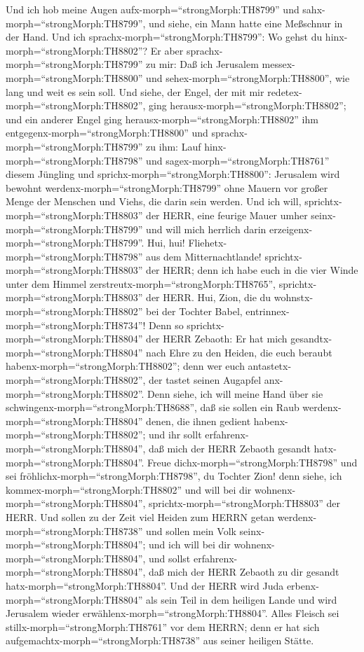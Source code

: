  Und ich hob meine Augen aufx-morph=``strongMorph:TH8799''
und sahx-morph=``strongMorph:TH8799'', und siehe, ein Mann hatte eine
Meßschnur in der Hand.  Und ich
sprachx-morph=``strongMorph:TH8799'': Wo gehst du
hinx-morph=``strongMorph:TH8802''? Er aber
sprachx-morph=``strongMorph:TH8799'' zu mir: Daß ich Jerusalem
messex-morph=``strongMorph:TH8800'' und
sehex-morph=``strongMorph:TH8800'', wie lang und weit es sein soll.
 Und siehe, der Engel, der mit mir
redetex-morph=``strongMorph:TH8802'', ging
herausx-morph=``strongMorph:TH8802''; und ein anderer Engel ging
herausx-morph=``strongMorph:TH8802'' ihm
entgegenx-morph=``strongMorph:TH8800''  und
sprachx-morph=``strongMorph:TH8799'' zu ihm: Lauf
hinx-morph=``strongMorph:TH8798'' und sagex-morph=``strongMorph:TH8761''
diesem Jüngling und sprichx-morph=``strongMorph:TH8800'': Jerusalem wird
bewohnt werdenx-morph=``strongMorph:TH8799'' ohne Mauern vor großer
Menge der Menschen und Viehs, die darin sein werden.  Und
ich will, sprichtx-morph=``strongMorph:TH8803'' der HERR, eine feurige
Mauer umher seinx-morph=``strongMorph:TH8799'' und will mich herrlich
darin erzeigenx-morph=``strongMorph:TH8799''.  Hui, hui!
Fliehetx-morph=``strongMorph:TH8798'' aus dem Mitternachtlande!
sprichtx-morph=``strongMorph:TH8803'' der HERR; denn ich habe euch in
die vier Winde unter dem Himmel zerstreutx-morph=``strongMorph:TH8765'',
sprichtx-morph=``strongMorph:TH8803'' der HERR.  Hui, Zion,
die du wohnstx-morph=``strongMorph:TH8802'' bei der Tochter Babel,
entrinnex-morph=``strongMorph:TH8734''!  Denn so
sprichtx-morph=``strongMorph:TH8804'' der HERR Zebaoth: Er hat mich
gesandtx-morph=``strongMorph:TH8804'' nach Ehre zu den Heiden, die euch
beraubt habenx-morph=``strongMorph:TH8802''; denn wer euch
antastetx-morph=``strongMorph:TH8802'', der tastet seinen Augapfel
anx-morph=``strongMorph:TH8802''.  Denn siehe, ich will
meine Hand über sie schwingenx-morph=``strongMorph:TH8688'', daß sie
sollen ein Raub werdenx-morph=``strongMorph:TH8804'' denen, die ihnen
gedient habenx-morph=``strongMorph:TH8802''; und ihr sollt
erfahrenx-morph=``strongMorph:TH8804'', daß mich der HERR Zebaoth
gesandt hatx-morph=``strongMorph:TH8804''.  Freue
dichx-morph=``strongMorph:TH8798'' und sei
fröhlichx-morph=``strongMorph:TH8798'', du Tochter Zion! denn siehe, ich
kommex-morph=``strongMorph:TH8802'' und will bei dir
wohnenx-morph=``strongMorph:TH8804'',
sprichtx-morph=``strongMorph:TH8803'' der HERR.  Und sollen
zu der Zeit viel Heiden zum HERRN getan
werdenx-morph=``strongMorph:TH8738'' und sollen mein Volk
seinx-morph=``strongMorph:TH8804''; und ich will bei dir
wohnenx-morph=``strongMorph:TH8804'', und sollst
erfahrenx-morph=``strongMorph:TH8804'', daß mich der HERR Zebaoth zu dir
gesandt hatx-morph=``strongMorph:TH8804''.  Und der HERR
wird Juda erbenx-morph=``strongMorph:TH8804'' als sein Teil in dem
heiligen Lande und wird Jerusalem wieder
erwählenx-morph=``strongMorph:TH8804''.  Alles Fleisch sei
stillx-morph=``strongMorph:TH8761'' vor dem HERRN; denn er hat sich
aufgemachtx-morph=``strongMorph:TH8738'' aus seiner heiligen Stätte.

